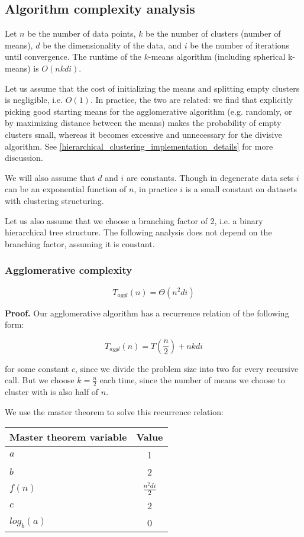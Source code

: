 \documentclass[../tech_report_1.tex]{subfiles}
\begin{document}
\subsection{Algorithm complexity analysis}

Let $n$ be the number of data points, $k$ be the number of clusters (number of means), $d$ be the dimensionality of the data, and $i$ be the number of iterations until convergence. The runtime of the $k$-means algorithm (including spherical k-means) is $O(nkdi)$.

Let us assume that the cost of initializing the means and splitting empty clusters is negligible, i.e. $O(1)$. In practice, the two are related: we find that explicitly picking good starting means for the agglomerative algorithm (e.g. randomly, or by maximizing distance between the means) makes the probability of empty clusters small, whereas it becomes excessive and unnecessary for the divisive algorithm. See \ref{hierarchical_clustering_implementation_details} for more discussion.

We will also assume that $d$ and $i$ are constants. Though in degenerate data sets $i$ can be an exponential function of $n$, in practice $i$ is a small constant on datasets with clustering structuring.

Let us also assume that we choose a branching factor of 2, i.e. a binary hierarchical tree structure. The following analysis does not depend on the branching factor, assuming it is constant.

\subsubsection{Agglomerative complexity}

\begin{theorem} $$T_{aggl}(n) = \Theta(n^2di)$$ \end{theorem}

\textbf{Proof.} Our agglomerative algorithm has a recurrence relation of the following form:

$$ T_{aggl}(n) = T(\frac{n}{2}) + nkdi $$

for some constant $c$, since we divide the problem size into two for every recursive call. But we choose $k=\frac{n}{2}$ each time, since the number of means we choose to cluster with is also half of $n$.

We use the master theorem \cite{thomas2001introduction} to solve this recurrence relation:

\begin{table}[ht]
\centering
\begin{tabular}{l || c }
\hline
\textbf{Master theorem variable} & \textbf{Value} \\
\hline
$a$ & 1 \\
$b$ & 2 \\
$f(n)$ & $\frac{n^2di}{2}$ \\
$c$ & 2 \\
$log_b(a)$ & 0 \\
\hline
\end{tabular}
\end{table}
\end{document}
